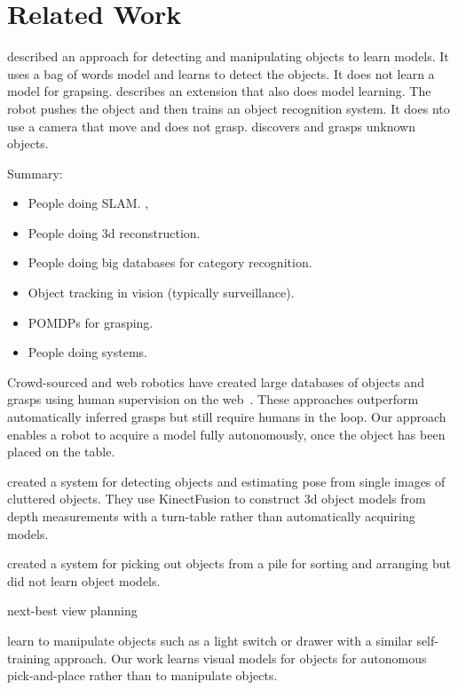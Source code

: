 \documentclass[conference]{IEEEtran}
\begin{document}
\section{Related Work}

\citet{ude12} described an approach for detecting and manipulating
objects to learn models.  It uses a bag of words model and learns to
detect the objects.  It does not learn a model for grapsing.
\citet{schiebener13} describes an extension that also does model
learning.  The robot pushes the object and then trains an object
recognition system.  It does nto use a camera that move and does not
grasp.
\citet{schiebener12} discovers and grasps unknown objects.

Summary: 
\begin{itemize}
\item People doing SLAM.  \citet{wang07, gallagher09}, 
\item People doing 3d reconstruction.   \citet{krainin11, banta00}
\item People doing big databases for category recognition.  \citet{kent14a, kent14, lai11a, goldfeder09}
\item Object tracking in vision (typically surveillance).
\item POMDPs for grasping.  \citet{platt11, hsiao10}
\item People doing systems.  \citet{hudson12, ciocarlie14}
\end{itemize}




Crowd-sourced and web robotics have created large databases of objects
and grasps using human supervision on the web~\citep{kent14a, kent14}.
These approaches outperform automatically inferred grasps but still
require humans in the loop.  Our approach enables a robot to acquire a
model fully autonomously, once the object has been placed on the
table.

\citet{zhu14} created a system for detecting objects and estimating
pose from single images of cluttered objects.  They use KinectFusion
to construct 3d object models from depth measurements with a
turn-table rather than automatically acquiring models.

\citet{chang12} created a system for picking out objects from a pile
for sorting and arranging but did not learn object models.  

next-best view planning~\citep{kriegel11}

\citet{nguyen14} learn to manipulate objects such as a light switch or
drawer with a similar self-training approach.  Our work learns visual
models for objects for autonomous pick-and-place rather than to
manipulate objects.
\end{document}
